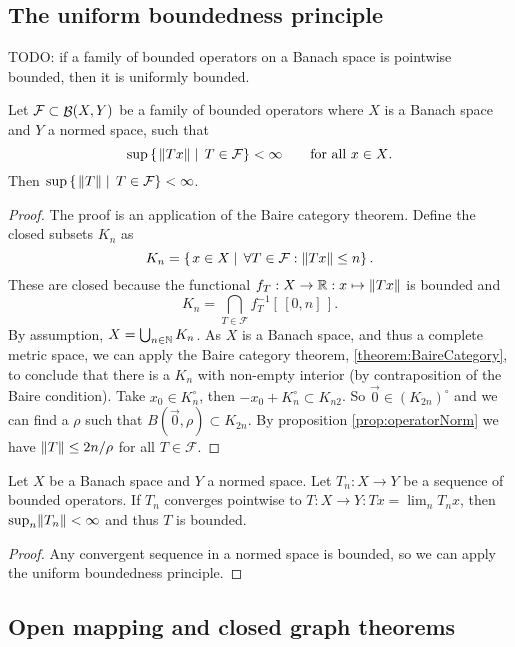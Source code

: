 \subsection{The uniform boundedness principle}
TODO: if a family of bounded operators on a Banach space is pointwise bounded, then it is uniformly bounded.
\begin{theorem}
Let $\mathcal{F}\subset \mathop{\mathcal{B}}(X,Y)$ be a family of bounded operators where $X$ is a Banach space and $Y$ a normed space, such that
\[ \sup\left\{\left. \lVert Tx\rVert \;\right|\; T\in\mathcal{F} \right\} < \infty \qquad \text{for all $x\in X$}. \]
Then $\sup\left\{\left. \lVert T\rVert \;\right|\; T\in\mathcal{F} \right\} < \infty$.
\end{theorem}
\begin{proof}
The proof is an application of the Baire category theorem. Define the closed subsets $K_n$ as
\[ K_n = \left\{\left. x\in X \;\right|\; \forall T\in\mathcal{F}: \lVert Tx\rVert\leq n \right\}. \]
These are closed because the functional $f_T: X\to \mathbb{R}: x\mapsto \lVert Tx\rVert$ is bounded and
\[ K_n = \bigcap_{T\in\mathcal{F}}f_T^{-1}[\,[0,n]\,]. \]
By assumption, $X=\bigcup_{n\in\mathbb{N}} K_n$. As $X$ is a Banach space, and thus a complete metric space, we can apply the Baire category theorem, \ref{theorem:BaireCategory}, to conclude that there is a $K_n$ with non-empty interior (by contraposition of the Baire condition). Take $x_0\in K_n^\circ$, then $-x_0+K_n^\circ \subset K_{n2}$. So $\vec{0}\in (K_{2n})^\circ$ and we can find a $\rho$ such that $B(\vec{0},\rho)\subset K_{2n}$. By proposition \ref{prop:operatorNorm} we have $\lVert T\rVert\leq 2n/\rho$ for all $T\in\mathcal{F}$.
\end{proof}
\begin{corollary}
Let $X$ be a Banach space and $Y$ a normed space. Let $T_n: X\to Y$ be a sequence of bounded operators. If $T_n$ converges pointwise to $T:X\to Y: Tx = \lim_n T_n x$, then $\sup_n\lVert T_n\rVert <\infty$ and thus $T$ is bounded.
\end{corollary}
\begin{proof}
Any convergent sequence in a normed space is bounded, so we can apply the uniform boundedness principle.
\end{proof}

\subsection{Open mapping and closed graph theorems}

